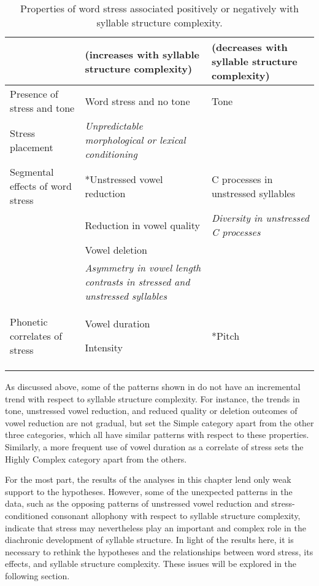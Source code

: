 \begin{table}
\begin{tabularx}{\textwidth}{III}
\lsptoprule
{}  & (increases with syllable structure complexity)  & (decreases with syllable structure complexity)\\\midrule
{Presence of stress and tone} & Word stress and no tone & Tone\\
{Stress placement} & \textit{Unpredictable morphological or lexical conditioning}\\
{Segmental effects of word stress} & *Unstressed vowel reduction & C processes in unstressed syllables\\
 & Reduction in vowel quality &  \textit{Diversity in unstressed C processes}\\
 & Vowel deletion\\
 & \textit{Asymmetry in vowel length contrasts in stressed and unstressed syllables}\\
{Phonetic correlates of stress} & Vowel duration

Intensity & *Pitch\\
\lspbottomrule
\end{tabularx}
\caption{\label{tab:5.14}Properties of word stress associated positively or negatively with syllable structure complexity.}
\end{table}

  As discussed above, some of the patterns shown in  do not have an incremental trend with respect to syllable structure complexity. For instance, the trends in tone, unstressed vowel reduction, and reduced quality or deletion outcomes of vowel reduction are not gradual, but set the Simple category apart from the other three categories, which all have similar patterns with respect to these properties. Similarly, a more frequent use of vowel duration as a correlate of stress sets the Highly Complex category apart from the others.

  For the most part, the results of the analyses in this chapter lend only weak support to the hypotheses. However, some of the unexpected patterns in the data, such as the opposing patterns of unstressed vowel reduction and stress-conditioned consonant allophony with respect to syllable structure complexity, indicate that stress may nevertheless play an important and complex role in the diachronic development of syllable structure. In light of the results here, it is necessary to rethink the hypotheses and the relationships between word stress, its effects, and syllable structure complexity. These issues will be explored in the following section.


